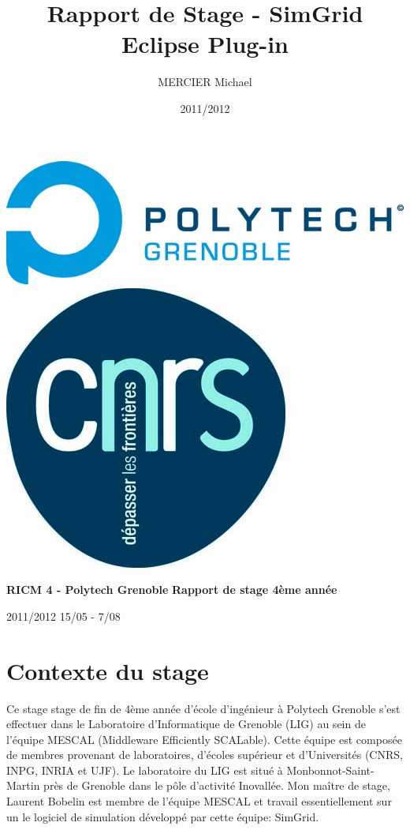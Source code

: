 \documentclass{article}
\title{Rapport de Stage - SimGrid Eclipse Plug-in}
\author{MERCIER Michael}
\date{2011/2012}
\makeatletter
\def\thetitle{\@title}
\def\theauthor{\@author}
\def\thecontext{RICM 4 - Polytech Grenoble}
\def\thefirsttitle{Rapport de stage 4ème année}
\def\thedate{2011/2012}
\def\theperiode{15/05 - 7/08}
\makeatother
\begin{document}
\begin{titlepage}
\includegraphics[scale=1]{img/logo_pg2009.png}
\hfill
\includegraphics[scale=0.2]{img/logo_cnrs.jpeg}

\centering

\vfill
{\Huge\bfseries \theauthor}
{\Huge\bfseries \thecontext}
{\Huge\bfseries \thefirsttitle}
\vskip 3cm
{\Huge\bfseries \thetitle}
\vfill



{\large \thedate}
{\large \theperiode}



\end{titlepage}


\tableofcontents

\newpage
\section{Contexte du stage}
	 Ce stage stage de fin de 4ème année d'école d'ingénieur à Polytech Grenoble s'est effectuer dans le Laboratoire d'Informatique de Grenoble (LIG) au sein de l'équipe MESCAL (Middleware Efficiently SCALable). Cette équipe est composée de membres provenant de laboratoires, d'écoles supérieur et d'Universités (CNRS, INPG, INRIA et UJF). Le laboratoire du LIG est situé à Monbonnot-Saint-Martin près de Grenoble dans le pôle d'activité Inovallée.
	 Mon maître de stage, Laurent Bobelin est membre de l'équipe MESCAL et travail essentiellement sur un le logiciel de simulation développé par cette équipe: SimGrid.
\end{document}

